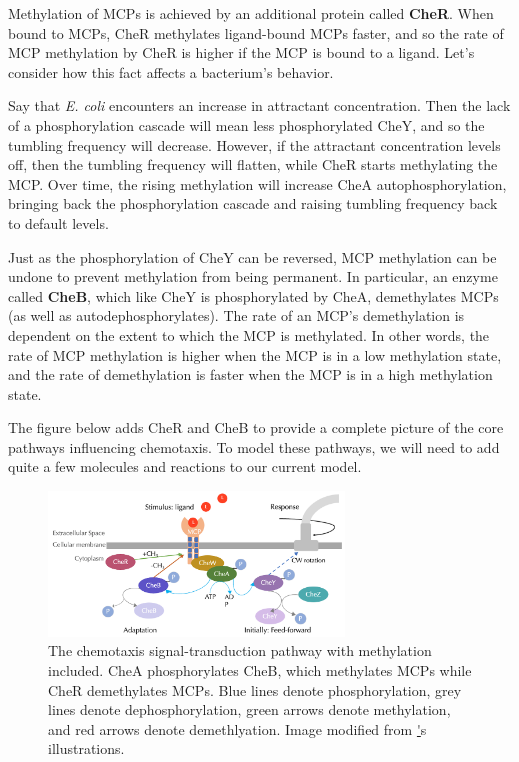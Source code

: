 Methylation of MCPs is achieved by an additional protein called \textbf{CheR}. When bound to MCPs, CheR methylates ligand-bound MCPs faster, and so the rate of MCP methylation by CheR is higher if the MCP is bound to a ligand. Let's consider how this fact affects a bacterium's behavior.

Say that \textit{E. coli} encounters an increase in attractant concentration. Then the lack of a phosphorylation cascade will mean less phosphorylated CheY, and so the tumbling frequency will decrease. However, if the attractant concentration levels off, then the tumbling frequency will flatten, while CheR starts methylating the MCP. Over time, the rising methylation will increase CheA autophosphorylation, bringing back the phosphorylation cascade and raising tumbling frequency back to default levels.

Just as the phosphorylation of CheY can be reversed, MCP methylation can be undone to prevent methylation from being permanent. In particular, an enzyme called \textbf{CheB}, which like CheY is phosphorylated by CheA, demethylates MCPs (as well as autodephosphorylates). The rate of an MCP's demethylation is dependent on the extent to which the MCP is methylated. In other words, the rate of MCP methylation is higher when the MCP is in a low methylation state, and the rate of demethylation is faster when the MCP is in a high methylation state.

The figure below adds CheR and CheB to provide a complete picture of the core pathways influencing chemotaxis. To model these pathways, we will need to add quite a few molecules and reactions to our current model.

\begin{figure}[h]
\centering
\mySfFamily
\includegraphics[width = 0.7\textwidth]{../images/chemotaxis_wholestory.png}
\caption{The chemotaxis signal-transduction pathway with methylation included. CheA phosphorylates CheB, which methylates MCPs while CheR demethylates MCPs. Blue lines denote phosphorylation, grey lines denote dephosphorylation, green arrows denote methylation, and red arrows denote demethlyation. Image modified from \href{http://chemotaxis.biology.utah.edu/Parkinson_Lab/projects/ecolichemotaxis/ecolichemotaxis.html}'s illustrations.}
\label{fig:chemotaxis_wholestory}
\end{figure}


